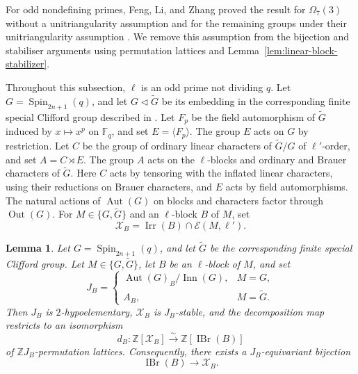 \documentclass[10pt]{amsart}
\newtheorem{lemma}[theorem]{Lemma}
\theoremstyle{definition}
\DeclareMathOperator{\Aut}{Aut}
\DeclareMathOperator{\Out}{Out}
\DeclareMathOperator{\Inn}{Inn}
\DeclareMathOperator{\IBr}{IBr}
\DeclareMathOperator{\Irr}{Irr}
\newcommand{\F}{\mathbb F}
\numberwithin{equation}{section}
\numberwithin{table}{section}
\begin{document}
For odd nondefining primes, Feng, Li, and Zhang proved the result for
$\Omega_7(3)$ without a unitriangularity assumption and for the remaining
groups under their unitriangularity assumption
\cite[Theorem~1 and Assumption~3.11]{FengLiZhang2022TypeB}.
We remove this assumption from the bijection and stabiliser arguments
using permutation lattices and Lemma~\ref{lem:linear-block-stabilizer}.

Throughout this subsection, $\ell$ is an odd prime not dividing $q$.
Let $G=\operatorname{Spin}_{2n+1}(q)$, and let $G\lhd\widetilde G$ be its
embedding in the corresponding finite special Clifford group described in
\cite[Section~3.1]{FengLiZhang2022TypeB}. Let $F_p$ be the field
automorphism of $\widetilde G$ induced by $x\mapsto x^p$ on $\F_q$,
and set $E=\langle F_p\rangle$. The group $E$ acts on $G$ by restriction.
Let $C$ be the group of ordinary linear characters of $\widetilde G/G$ of
$\ell'$-order, and set $A=C\rtimes E$.
The group $A$ acts on the $\ell$-blocks and ordinary and Brauer characters
of $\widetilde G$.  Here $C$ acts by tensoring with the inflated linear
characters, using their reductions on Brauer characters, and $E$ acts by
field automorphisms.  The natural actions of $\Aut(G)$ on blocks and characters factor through
$\Out(G)$.
For $M\in\{G,\widetilde G\}$ and an $\ell$-block $B$ of $M$, set
\[
 \mathcal X_B=\Irr(B)\cap\mathcal E(M,\ell').
\]

\begin{lemma}\label{lem:type-b-conlon-block}
Let $G=\operatorname{Spin}_{2n+1}(q)$, and let $\widetilde G$ be the
corresponding finite special Clifford group.
Let $M\in\{G,\widetilde G\}$, let $B$ be an $\ell$-block of $M$, and set
\[
 J_B=
 \begin{cases}
  \Aut(G)_B/\Inn(G),&M=G,\\
  A_B,&M=\widetilde G.
 \end{cases}
\]
Then $J_B$ is $2$-hypoelementary, $\mathcal X_B$ is $J_B$-stable, and the
decomposition map restricts to an isomorphism
\[
 d_B:\mathbb Z[\mathcal X_B]\xrightarrow{\sim}\mathbb Z[\IBr(B)]
\]
of $\mathbb Z J_B$-permutation lattices.  Consequently, there exists a
$J_B$-equivariant bijection
\[
 \IBr(B)\longrightarrow\mathcal X_B.
\]
\end{lemma}
\end{document}
